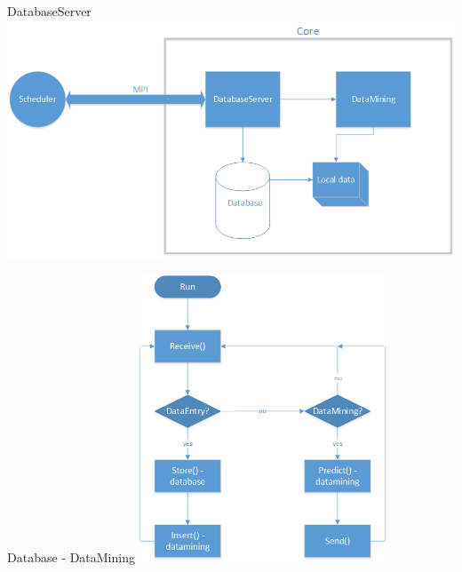 	\begin{frame}{DatabaseServer}
	\includegraphics[width=1.0\textwidth]{images/Zeichnung6.png}
	\end{frame}
	
	\begin{frame}{Database - DataMining}
	\centering
	\includegraphics[width=0.55\textwidth]{images/datamining_flow.png}
	\end{frame}
